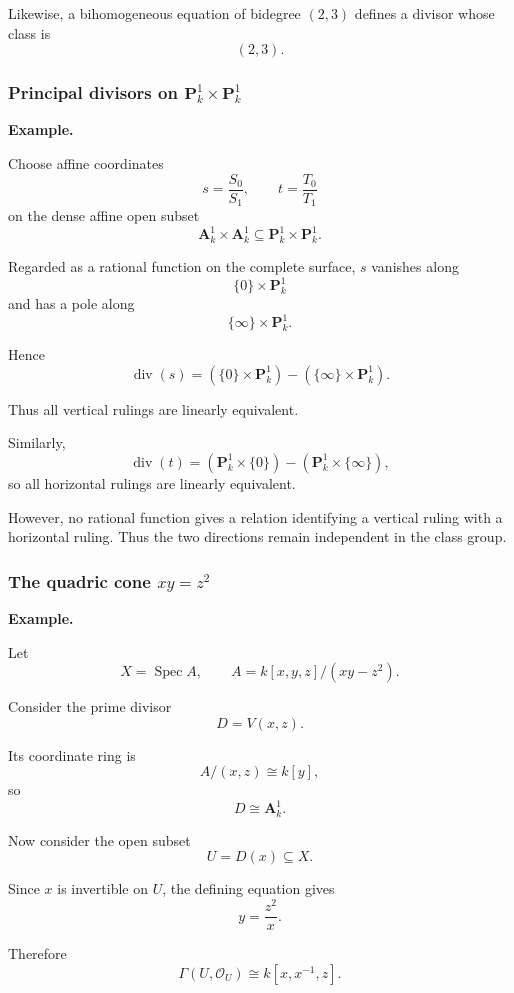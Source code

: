 Likewise, a bihomogeneous equation of bidegree \((2,3)\) defines a divisor whose class is
\[
(2,3).
\]

\subsubsection{Principal divisors on \(\mathbf P^1_k\times\mathbf P^1_k\)}

\textbf{Example.}

Choose affine coordinates
\[
s=\frac{S_0}{S_1},
\qquad
t=\frac{T_0}{T_1}
\]
on the dense affine open subset
\[
\mathbf A^1_k\times\mathbf A^1_k
\subseteq
\mathbf P^1_k\times\mathbf P^1_k.
\]

Regarded as a rational function on the complete surface, \(s\) vanishes along
\[
\{0\}\times\mathbf P^1_k
\]
and has a pole along
\[
\{\infty\}\times\mathbf P^1_k.
\]

Hence
\[
\operatorname{div}(s)
=
(\{0\}\times\mathbf P^1_k)
-
(\{\infty\}\times\mathbf P^1_k).
\]

Thus all vertical rulings are linearly equivalent.

Similarly,
\[
\operatorname{div}(t)
=
(\mathbf P^1_k\times\{0\})
-
(\mathbf P^1_k\times\{\infty\}),
\]
so all horizontal rulings are linearly equivalent.

However, no rational function gives a relation identifying a vertical ruling with a horizontal ruling. Thus the two directions remain independent in the class group.

\subsubsection{\texorpdfstring{The quadric cone \(xy=z^2\)}{The quadric cone xy=z2}}

\textbf{Example.}

Let
\[
X=\operatorname{Spec}A,
\qquad
A=k[x,y,z]/(xy-z^2).
\]

Consider the prime divisor
\[
D=V(x,z).
\]

Its coordinate ring is
\[
A/(x,z)
\cong
k[y],
\]
so
\[
D\cong\mathbf A^1_k.
\]

Now consider the open subset
\[
U=D(x)\subseteq X.
\]

Since \(x\) is invertible on \(U\), the defining equation gives
\[
y=\frac{z^2}{x}.
\]

Therefore
\[
\Gamma(U,\mathcal O_U)
\cong
k[x,x^{-1},z].
\]

